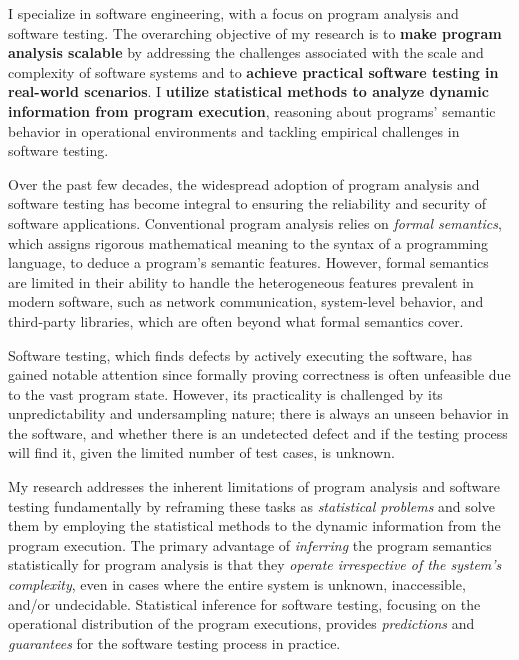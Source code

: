 \documentclass{article}
\begin{document}
\thispagestyle{firstpage} %


\noindent I specialize in software engineering, with a focus on program analysis and software testing. The overarching objective of my research is to \textbf{\color{blue} make program analysis scalable} by addressing the challenges associated with the scale and complexity of software systems and to \textbf{\color{blue} achieve practical software testing in real-world scenarios}. I \textbf{utilize statistical methods to analyze dynamic information from program execution}, reasoning about programs' semantic behavior in operational environments and tackling empirical challenges in software testing.

Over the past few decades, the widespread adoption of program analysis and software testing has become integral to ensuring the reliability and security of software applications. Conventional program analysis relies on \emph{formal semantics}, which assigns rigorous mathematical meaning to the syntax of a programming language, to deduce a program's semantic features. However, formal semantics are limited in their ability to handle the heterogeneous features prevalent in modern software, such as network communication, system-level behavior, and third-party libraries, which are often beyond what formal semantics cover.


Software testing, which finds defects by actively executing the software, has gained notable attention since formally proving correctness is often unfeasible due to the vast program state. However, its practicality is challenged by its unpredictability and undersampling nature; there is always an unseen behavior in the software, and whether there is an undetected defect and if the testing process will find it, given the limited number of test cases, is unknown.

My research addresses the inherent limitations of program analysis and software testing fundamentally by reframing these tasks as \emph{statistical problems} and solve them by employing the statistical methods to the dynamic information from the program execution. The primary advantage of \emph{inferring} the program semantics statistically for program analysis is that they \emph{operate irrespective of the system's complexity}, even in cases where the entire system is unknown, inaccessible, and/or undecidable. Statistical inference for software testing, focusing on the operational distribution of the program executions, provides \emph{predictions} and \emph{guarantees} for the software testing process in practice.
\end{document}
